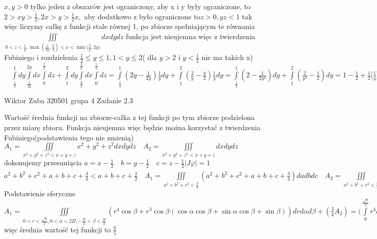 \documentclass{article}
\begin{document}
$x,y>0$ tylko jeden z obszarów jest ograniczony, aby x i y były ograniczone, to
$
2>xy>\frac{1}{2},2x>y>\frac{1}{2}x,
$
aby dodatkowo z było ograniczone to$ z>0,yz<1$
tak więc liczymy całkę z funkcji stale równej 1, po zbiorze spełniającym te równania
$
\iiint\limits_{0<z<\frac{1}{y}, \max{(\frac{1}{2y},\frac{y}{2})}<x<\min{(\frac{2}{y},2y})}dxdydz
$
funkcja jest nieujemna więc z twierdzenia Fubiniego i rozdzielenia $\frac{1}{2}\le y\le1, 1<y\le2$( dla $y>2$ i $y<\frac{1}{2}$ nie ma takich x)
$\quad
\int\limits_{\frac{1}{2}}^{1}dy\int\limits_{\frac{1}{2y}}^{2y}dx\int\limits_{0}^{\frac{1}{y}}dz
+\int\limits_{1}^{2}dy\int\limits_{\frac{y}{2}}^{\frac{2}{y}}dx\int\limits_{0}^{\frac{1}{y}}dz
=
\int\limits_{\frac{1}{2}}^{1}(2y-\frac{1}{2y})\frac{1}{y}dy+\int\limits_{1}^{2}(\frac{2}{y}-\frac{y}{2})\frac{1}{y}dy
=
\int\limits_{\frac{1}{2}}^{1}(2-\frac{1}{2y^2})dy+\int\limits_{1}^{2}(\frac{2}{y^2}-\frac{1}{2})dy
=
1-\frac{1}{2}+\frac{1}{2}\bigl[\frac{1}{y}\bigr]_{\frac{1}{2}}^{1}-2\bigl[\frac{1}{y}\bigr]_{1}^{2}
=\frac{1}{2}-\frac{1}{2}+1=1
$
\newline


\newpage
Wiktor Zuba 320501 grupa 4
\newline
Zadanie 2.3
\newline




Wartość średnia funkcji na zbiorze-całka z tej funkcji po tym zbiorze podzielona przez miarę zbioru.
Funkcja nieujemna więc będzie można korzystać z twierdzenia Fubiniego(podstawienia tego nie zmienią)
$
A_{1}=\iiint\limits_{x^2+y^2+z^2<x+y+z}x^2+y^2+z^2dxdydz \quad
A_{2}=\iiint\limits_{x^2+y^2+z^2<x+y+z}dxdydz
$
dokonujemy przesuniącia $ a=x-\frac{1}{2}\quad b=y-\frac{1}{2}\quad c=z-\frac{1}{2} |J\varphi|=1$
$
a^2+b^2+c^2+a+b+c+\frac{3}{4}<a+b+c+\frac{3}{2} \quad
A_{1}=\iiint\limits_{a^2+b^2+c^2<\frac{3}{4}}(a^2+b^2+c^2+a+b+c+\frac{3}{4}) dadbdc \quad
A_{2}=\iiint\limits_{a^2+b^2+c^2<\frac{3}{4}}dadbdc=\frac{4}{3}\Pi(\frac{\sqrt{3}}{2})^3=\frac{\sqrt{3}\Pi}{2}
$
Podstawienie sferyczne
$
A_{1}=\iiint\limits_{0<r<\frac{\sqrt{3}}{2},0<\alpha<2\Pi,-\frac{\Pi}{2}<\beta<\frac{\Pi}{2}}
(r^4\cos{\beta}+r^3\cos{\beta}(\cos{\alpha}\cos{\beta}+\sin{\alpha}\cos{\beta}+\sin{\beta}))drd\alpha d\beta+(\frac{3}{4}A_{2})
=\bigl(\int\limits_{0}^{\frac{\sqrt{3}}{2}}r^4dr\bigr)\bigl( \int\limits_{-\frac{\Pi}{2}}^{\frac{\Pi}{2}}\cos{\beta}d\beta\bigr)\bigl(\int\limits_{0}^{2\Pi}d\alpha\bigr)
+\bigl(\int\limits_{0}^{\frac{\sqrt{3}}{2}}r^3dr\bigr)\bigl( \bigl(\int\limits_{-\frac{\Pi}{2}}^{\frac{\Pi}{2}}\cos^2{\beta}d\beta\bigr)\bigl(\int\limits_{0}^{2\Pi}sin{(\alpha+\frac{\Pi}{4})}d\alpha \bigr)
+\bigl(\int\limits_{-\frac{\Pi}{2}}^{\frac{\Pi}{2}}\frac{1}{2}\cos{2\beta}d\beta\bigr)\bigl(\int\limits_{0}^{2\Pi}d\alpha\bigr)\bigr)
+\frac{3\sqrt{3}\Pi}{8}
=\frac{9\sqrt{3}}{160}\cdot 2\cdot 2\Pi+\frac{9}{64}\cdot\bigl(\int d\beta\bigr)\cdot 0+\frac{3\sqrt{3}\Pi}{8}
=\frac{3\sqrt{3}\Pi}{5}
$więc średnia wartość tej funkcji to
$
\frac{6}{5}
$
\newline
\end{document}

